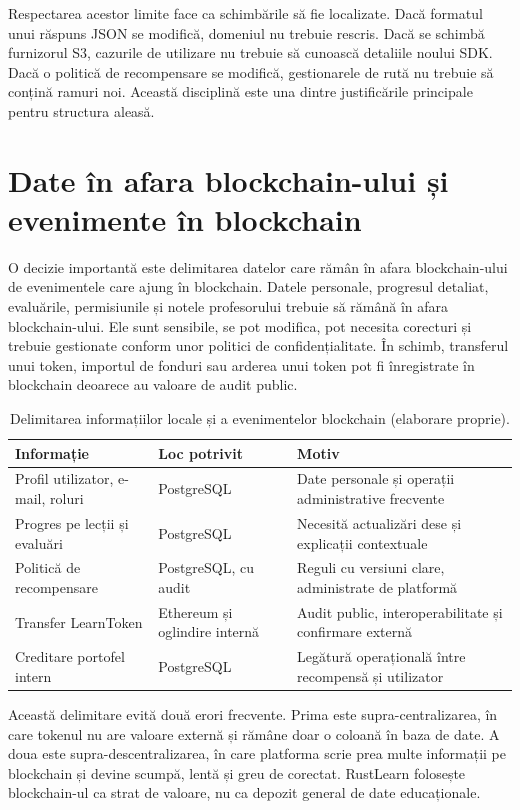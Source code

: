Respectarea acestor limite face ca schimbările să fie localizate. Dacă formatul unui răspuns JSON se modifică, domeniul nu trebuie rescris. Dacă se schimbă furnizorul S3, cazurile de utilizare nu trebuie să cunoască detaliile noului SDK. Dacă o politică de recompensare se modifică, gestionarele de rută nu trebuie să conțină ramuri noi. Această disciplină este una dintre justificările principale pentru structura aleasă.

\section{Date în afara blockchain-ului și evenimente în blockchain}
O decizie importantă este delimitarea datelor care rămân în afara blockchain-ului de evenimentele care ajung în blockchain. Datele personale, progresul detaliat, evaluările, permisiunile și notele profesorului trebuie să rămână în afara blockchain-ului. Ele sunt sensibile, se pot modifica, pot necesita corecturi și trebuie gestionate conform unor politici de confidențialitate. În schimb, transferul unui token, importul de fonduri sau arderea unui token pot fi înregistrate în blockchain deoarece au valoare de audit public.

\begin{table}[H]
    \centering
    \caption{Delimitarea informațiilor locale și a evenimentelor blockchain (elaborare proprie).}
    \label{tab:onchain_offchain}
    \begin{tabular}{P{4cm}P{4.8cm}P{4.8cm}}
        \toprule
        Informație & Loc potrivit & Motiv \\
        \midrule
        Profil utilizator, e-mail, roluri & PostgreSQL & Date personale și operații administrative frecvente \\
        Progres pe lecții și evaluări & PostgreSQL & Necesită actualizări dese și explicații contextuale \\
        Politică de recompensare & PostgreSQL, cu audit & Reguli cu versiuni clare, administrate de platformă \\
        Transfer LearnToken & Ethereum și oglindire internă & Audit public, interoperabilitate și confirmare externă \\
        Creditare portofel intern & PostgreSQL & Legătură operațională între recompensă și utilizator \\
        \bottomrule
    \end{tabular}
\end{table}

Această delimitare evită două erori frecvente. Prima este supra-centralizarea, în care tokenul nu are valoare externă și rămâne doar o coloană în baza de date. A doua este supra-descentralizarea, în care platforma scrie prea multe informații pe blockchain și devine scumpă, lentă și greu de corectat. RustLearn folosește blockchain-ul ca strat de valoare, nu ca depozit general de date educaționale.

